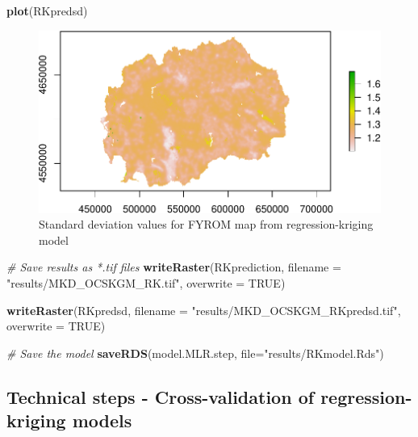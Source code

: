 \documentclass[10pt,b5paper,]{book}
\newenvironment{Shaded}{\begin{snugshade}}{\end{snugshade}}
\newcommand{\CommentTok}[1]{\textcolor[rgb]{0.56,0.35,0.01}{\textit{#1}}}
\newcommand{\DataTypeTok}[1]{\textcolor[rgb]{0.13,0.29,0.53}{#1}}
\newcommand{\KeywordTok}[1]{\textcolor[rgb]{0.13,0.29,0.53}{\textbf{#1}}}
\newcommand{\NormalTok}[1]{#1}
\newcommand{\OtherTok}[1]{\textcolor[rgb]{0.56,0.35,0.01}{#1}}
\newcommand{\StringTok}[1]{\textcolor[rgb]{0.31,0.60,0.02}{#1}}
\theoremstyle{definition}
\theoremstyle{definition}
\theoremstyle{definition}
\theoremstyle{remark}
\begin{document}
\begin{Shaded}
\begin{Highlighting}[]
\KeywordTok{plot}\NormalTok{(RKpredsd)}
\end{Highlighting}
\end{Shaded}

\begin{figure}
\centering
\includegraphics{SOCMapping_files/figure-latex/predSDRK-1.pdf}
\caption{\label{fig:predSDRK}Standard deviation values for FYROM map from
regression-kriging model}
\end{figure}

\begin{Shaded}
\begin{Highlighting}[]
\CommentTok{# Save results as *.tif files}
\KeywordTok{writeRaster}\NormalTok{(RKprediction, }\DataTypeTok{filename =} \StringTok{"results/MKD_OCSKGM_RK.tif"}\NormalTok{,}
            \DataTypeTok{overwrite =} \OtherTok{TRUE}\NormalTok{)}

\KeywordTok{writeRaster}\NormalTok{(RKpredsd, }\DataTypeTok{filename =} \StringTok{"results/MKD_OCSKGM_RKpredsd.tif"}\NormalTok{,}
            \DataTypeTok{overwrite =} \OtherTok{TRUE}\NormalTok{)}
\end{Highlighting}
\end{Shaded}

\begin{Shaded}
\begin{Highlighting}[]
\CommentTok{# Save the model}
\KeywordTok{saveRDS}\NormalTok{(model.MLR.step, }\DataTypeTok{file=}\StringTok{"results/RKmodel.Rds"}\NormalTok{)}
\end{Highlighting}
\end{Shaded}

\hypertarget{technical-steps---cross-validation-of-regression-kriging-models}{%
\subsection{Technical steps - Cross-validation of regression-kriging
models}\label{technical-steps---cross-validation-of-regression-kriging-models}}
\end{document}
